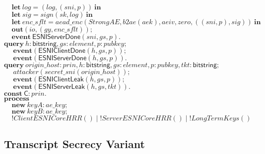 \documentclass{article}
\theoremstyle{definition}
\newcommand{\kwl}[1]{\mathbf{#1}}
\newcommand{\kwc}[1]{\mathsf{#1}}
\newcommand{\kwt}[1]{\mathsf{#1}}
\newcommand{\kwe}[1]{\mathsf{#1}}
\newcommand{\var}[1]{\mathit{#1}}
\theoremstyle{definition}
\begin{document}
\begin{tabbing}
$\ \ \ \ \ \kwl{let}\ \var{log} = (\var{log}, (\var{sni}, \var{p}))\ \kwl{in} $\\
$\ \ \ \ \ \kwl{let}\ \var{sig} = \var{sign}(\var{sk}, \var{log})\ \kwl{in} $\\
$\ \ \ \ \ \kwl{let}\ \var{enc{\_}sflt} = \var{aead{\_}enc}(\var{StrongAE}, \var{b2ae}(\var{aek}), \var{aeiv}, \var{zero}, ((\var{sni}, \var{p}), \var{sig}))\ \kwl{in} $\\
$\ \ \ \ \ \kwl{out}(\var{io}, (\var{gy}, \var{enc{\_}sflt})); $\\
$\ \ \ \ \ \kwl{event}\ \kwe{ESNIServerDone}(\var{sni}, \var{gs}, \var{p}). $\\
$ $\\
$\kwl{query}\ \var{h}{:}\kwt{bitstring}, \var{gs}{:}\var{element}, \var{p}{:}\var{pubkey}; $\\
$\ \ \ \ \ \ \kwl{event}(\kwe{ESNIClientDone}(\var{h}, \var{gs}, \var{p})); $\\
$\ \ \ \ \ \ \kwl{event}(\kwe{ESNIServerDone}(\var{h}, \var{gs}, \var{p})). $\\
$ $\\
$\kwl{query}\ \var{origin{\_}host}{:}\var{prin}, \var{h}{:}\kwt{bitstring}, \var{gs}{:}\var{element}, \var{p}{:}\var{pubkey}, \var{tkt}{:}\kwt{bitstring}; $\\
$\ \ \ \ \ \ \var{attacker}(\var{secret{\_}sni}(\var{origin{\_}host})); $\\
$\ \ \ \ \ \ \kwl{event}(\kwe{ESNIClientLeak}(\var{h}, \var{gs}, \var{p})); $\\
$\ \ \ \ \ \ \kwl{event}(\kwe{ESNIServerLeak}(\var{h}, \var{gs}, \var{tkt})). $\\
$ $\\
$\kwl{const}\ \kwc{C}{:}\var{prin}. $\\
$\kwl{process} $\\
$\ \ \ \ \ \kwl{new}\ \var{keyA}{:}\var{ae{\_}key}; $\\
$\ \ \ \ \ \kwl{new}\ \var{keyB}{:}\var{ae{\_}key}; $\\
$\ \ \ \ \ !\var{ClientESNICoreHRR}()\mid!\var{ServerESNICoreHRR}()\mid!\var{LongTermKeys}() $\\
$$
\end{tabbing}

\subsection{Transcript Secrecy Variant}
\end{document}
